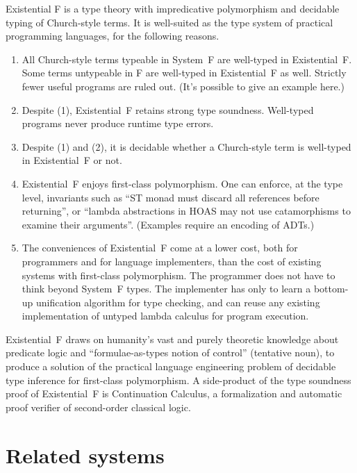 \documentclass{amsart}
\begin{document}
Existential F is a type theory with impredicative polymorphism
and decidable typing of Church-style terms. It is well-suited as
the type system of practical programming languages, for the
following reasons.
\begin{enumerate}
\item All Church-style terms typeable in System~F are well-typed
in Existential~F. Some terms untypeable in F are well-typed in
Existential~F as well. Strictly fewer useful programs are ruled
out. (It's possible to give an example here.)

\item Despite (1), Existential~F retains strong type soundness.
Well-typed programs never produce runtime type errors.

\item Despite (1) and (2), it is decidable whether a Church-style
term is well-typed in Existential~F or not.

\item Existential~F enjoys first-class polymorphism. One can
enforce, at the type level, invariants such as ``ST monad must
discard all references before returning'', or ``lambda
abstractions in HOAS may not use catamorphisms to examine their
arguments''. (Examples require an encoding of ADTs.)

\item The conveniences of Existential~F come at a lower cost,
both for programmers and for language implementers, than the cost
of existing systems with first-class polymorphism. The programmer
does not have to think beyond System~F types. The implementer has
only to learn a bottom-up unification algorithm for type
checking, and can reuse any existing implementation of untyped
lambda calculus for program execution.
\end{enumerate}

Existential~F draws on humanity's vast and purely theoretic
knowledge about predicate logic and ``formulae-as-types notion of
control'' (tentative noun), to produce a solution of the
practical language engineering problem of decidable type
inference for first-class polymorphism. A side-product of the
type soundness proof of Existential~F is Continuation Calculus, a
formalization and automatic proof verifier of second-order
classical logic.


\section{Related systems}
\end{document}
